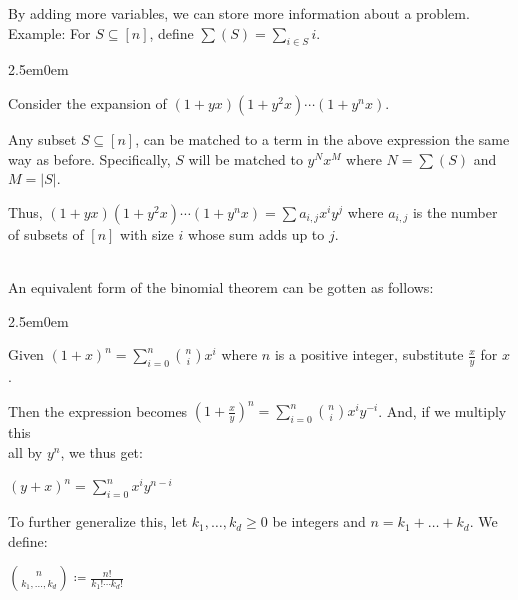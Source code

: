\documentclass{book}
\newcommand{\hTwo}{%
\color{MidnightBlue}%
   \fontsize{13}{15}\selectfont%
}
\newenvironment{myIndent}{%
   \begin{adjustwidth}{2.5em}{0em}%
}{%
   \end{adjustwidth}%
}
\newcommand{\mySepTwo}[1][.]{%
   {\noindent\color{#1}{\rule{6.5in}{0.5mm}}}\\%
}
\newcommand{\retTwo}{\hfill\bigbreak}
\begin{document}
By adding more variables, we can store more information about a problem.\\ Example: For $S \subseteq [n]$, define $\sum(S) = \sum\limits_{i \in S}i$.

\begin{myIndent}\hTwo
   Consider the expansion of $(1 + yx)(1 + y^2x)\cdots(1 + y^nx)$.\retTwo

   Any subset $S \subseteq [n]$, can be matched to a term in the above expression the same way as before. Specifically, $S$ will be matched to $y^Nx^M$ where $N = \sum(S)$ and $M = |S|$.\retTwo

   Thus, $(1+yx)(1+y^2x)\cdots(1+y^nx) = \sum a_{i,j}x^iy^j$ where $a_{i,j}$ is the number of subsets of $[n]$ with size $i$ whose sum adds up to $j$.\retTwo
\end{myIndent}

\mySepTwo 

An equivalent form of the binomial theorem can be gotten as follows:

\begin{myIndent}\hTwo
   Given $(1+x)^n = \sum\limits_{i=0}^n \binom{n}{i}x^i$ where $n$ is a positive integer, substitute $\frac{x}{y}$ for $x$.\retTwo
   
   Then the expression becomes $(1 + \frac{x}{y})^n = \sum\limits_{i=0}^n \binom{n}{i}x^iy^{-i}$. And, if we multiply this\\ [-7pt] all by $y^n$, we thus get:

   {\center $(y+x)^n = \sum\limits_{i=0}^n x^iy^{n-i}$ \retTwo\par}
\end{myIndent}

To further generalize this, let $k_1, \ldots, k_d \geq 0$ be integers and $n = k_1 + \ldots + k_d$. We define:

{\centering $\displaystyle \binom{n}{k_1, \ldots, k_d} \coloneq \frac{n!}{k_1!\cdots k_d!}$ \retTwo\par}
\end{document}
